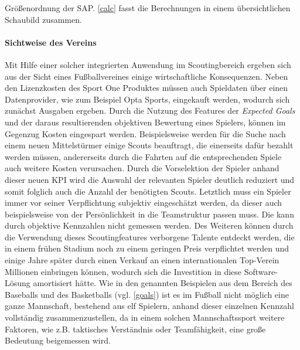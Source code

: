 Größenordnung der SAP. \vref{calc} fasst die Berechnungen in einem übersichtlichen Schaubild zusammen.




\paragraph{Sichtweise des Vereins}
Mit Hilfe einer solcher integrierten Anwendung im Scoutingbereich ergeben sich aus der Sicht eines Fußballvereines einige wirtschaftliche Konsequenzen. Neben den Lizenzkosten des Sport One Produktes müssen auch Spieldaten über einen Datenprovider, wie zum Beispiel Opta Sports, eingekauft werden, wodurch sich zunächst Ausgaben ergeben. Durch die Nutzung des Features der \textit{Expected Goals} und der daraus resultierenden objektiven Bewertung eines Spielers, können im Gegenzug Kosten eingespart werden. Beispielsweise werden für die Suche nach einem neuen Mittelstürmer einige Scouts beauftragt, die einerseits dafür bezahlt werden müssen, andererseits durch die Fahrten auf die entsprechenden Spiele auch weitere Kosten verursachen. Durch die Vorselektion der Spieler anhand dieser neuen KPI wird die Auswahl der relevanten Spieler deutlich reduziert und somit folglich auch die Anzahl der benötigten Scouts. Letztlich muss ein Spieler immer vor seiner Verpflichtung subjektiv eingeschätzt werden, da dieser auch beispielsweise von der Persönlichkeit in die Teamstruktur passen muss. Die kann durch objektive Kennzahlen nicht gemessen werden. Des Weiteren können durch die Verwendung dieses Scoutingfeatures verborgene Talente entdeckt werden, die in einem frühen Stadium noch zu einem geringen Preis verpflichtet werden und einige Jahre später durch einen Verkauf an einen internationalen Top-Verein Millionen einbringen können, wodurch sich die Investition in diese Software-Lösung amortisiert hätte. Wie in den genannten Beispielen aus dem Bereich des Baseballs und des Basketballs (vgl. \vref{goals}) ist es im Fußball nicht möglich eine ganze Mannschaft, bestehend aus elf Spielern, anhand dieser einzelnen Kennzahl vollständig zusammenzustellen, da in einem solchen Mannschaftssport weitere Faktoren, wie z.B. taktisches Verständnis oder Teamfähigkeit, eine große Bedeutung beigemessen wird. 